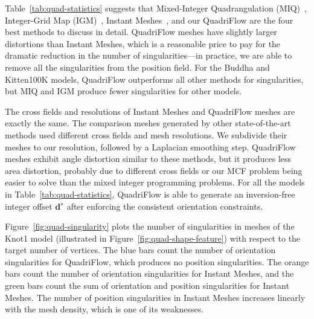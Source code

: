 Table~\ref{tab:quad-statistics} suggests that Mixed-Integer Quadrangulation (MIQ)~\cite{bommes2009mixed}, Integer-Grid Map (IGM)~\cite{bommes2013integer}, Instant Meshes~\cite{jakob2015instant}, and our QuadriFlow are the four best methods to discuss in detail. QuadriFlow meshes have slightly larger distortions than Instant Meshes, which is a reasonable price to pay for the dramatic reduction in the number of singularities---in practice, we are able to remove all the singularities from the position field. For the Buddha and Kitten100K models, QuadriFlow outperforms all other methods for singularities, but MIQ and IGM produce fewer singularities for other models.

The cross fields and resolutions of Instant Meshes and QuadriFlow meshes are exactly the same. The comparison meshes generated by other state-of-the-art methods used different cross fields and mesh resolutions. We subdivide their meshes to our resolution, followed by a Laplacian smoothing step. QuadriFlow meshes exhibit angle distortion similar to these methods, but it produces less area distortion, probably due to different cross fields or our MCF problem being easier to solve than the mixed integer programming problems.  For all the models in Table~\ref{tab:quad-statistics}, QuadriFlow is able to generate an inversion-free integer offset ${\textbf{d}}^{\star}$ after enforcing the consistent orientation constraints. %

Figure~\ref{fig:quad-singularity} plots the number of singularities in meshes of the Knot1 model (illustrated in Figure~\ref{fig:quad-shape-feature}) with respect to the target number of vertices. The blue bars count the number of orientation singularities for QuadriFlow, which produces no position singularities. The orange bars count the number of orientation singularities for Instant Meshes, and the green bars count the sum of orientation and position singularities for Instant Meshes. The number of position singularities in Instant Meshes increases linearly with the mesh density, which is one of its weaknesses.

